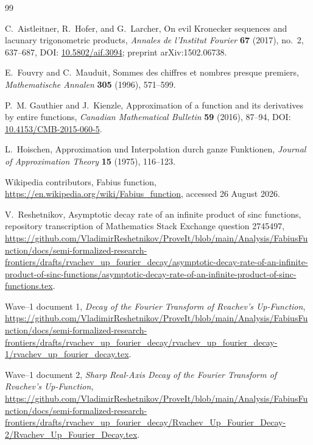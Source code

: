 \documentclass[11pt,oneside]{article}
\theoremstyle{definition}
\theoremstyle{remark}
\begin{document}
\begin{thebibliography}{99}

C.~Aistleitner, R.~Hofer, and G.~Larcher,
\newblock On evil Kronecker sequences and lacunary trigonometric products,
\newblock \emph{Annales de l'Institut Fourier} \textbf{67} (2017), no.~2,
637--687,
\newblock DOI: \href{https://doi.org/10.5802/aif.3094}{10.5802/aif.3094};
preprint arXiv:1502.06738.

E.~Fouvry and C.~Mauduit,
\newblock Sommes des chiffres et nombres presque premiers,
\newblock \emph{Mathematische Annalen} \textbf{305} (1996), 571--599.

P.~M. Gauthier and J.~Kienzle,
\newblock Approximation of a function and its derivatives by entire functions,
\newblock \emph{Canadian Mathematical Bulletin} \textbf{59} (2016), 87--94,
\newblock DOI: \href{https://doi.org/10.4153/CMB-2015-060-5}{10.4153/CMB-2015-060-5}.

L.~Hoischen,
\newblock Approximation und Interpolation durch ganze Funktionen,
\newblock \emph{Journal of Approximation Theory} \textbf{15} (1975), 116--123.

Wikipedia contributors,
\newblock Fabius function,
\newblock \url{https://en.wikipedia.org/wiki/Fabius_function}, accessed
26 August 2026.

V.~Reshetnikov,
\newblock Asymptotic decay rate of an infinite product of sinc functions,
\newblock repository transcription of Mathematics Stack Exchange question
2745497,
\newblock \url{https://github.com/VladimirReshetnikov/ProveIt/blob/main/Analysis/FabiusFunction/docs/semi-formalized-research-frontiers/drafts/rvachev_up_fourier_decay/asymptotic-decay-rate-of-an-infinite-product-of-sinc-functions/asymptotic-decay-rate-of-an-infinite-product-of-sinc-functions.tex}.

\newblock Wave--1 document 1,
\newblock \emph{Decay of the Fourier Transform of Rvachev's Up-Function},
\newblock \url{https://github.com/VladimirReshetnikov/ProveIt/blob/main/Analysis/FabiusFunction/docs/semi-formalized-research-frontiers/drafts/rvachev_up_fourier_decay/rvachev_up_fourier_decay-1/rvachev_up_fourier_decay.tex}.

\newblock Wave--1 document 2,
\newblock \emph{Sharp Real-Axis Decay of the Fourier Transform of Rvachev's Up-Function},
\newblock \url{https://github.com/VladimirReshetnikov/ProveIt/blob/main/Analysis/FabiusFunction/docs/semi-formalized-research-frontiers/drafts/rvachev_up_fourier_decay/Rvachev_Up_Fourier_Decay-2/Rvachev_Up_Fourier_Decay.tex}.


\end{thebibliography}
\end{document}
